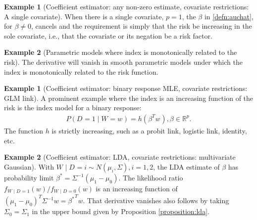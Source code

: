 \documentclass[12pt]{article}
\renewcommand{\P}{P}
\newcommand{\W}[1][]{W_{#1}}
\newcommand{\w}[1][]{w_{#1}}
\newcommand{\D}[1][]{D_{#1}}
\renewcommand{\t}[1]{{#1}^T}
\renewcommand{\star}[1]{{#1}^\ast}
\newcommand{\h}{h}
\theoremstyle{definition}
\newtheorem{example}{Example}%
\newtheorem{subexample}{Example}%
\begin{document}
\begin{example}[Coefficient estimator: any non-zero estimate,
  covariate restrictions: A single covariate] When there is a single
  covariate, $p=1$, the $\beta$ in \eqref{defn:auchat},
  for $\beta\neq 0$, cancels and the requirement is simply that the
  risk be increasing in the sole covariate, i.e., that the covariate
  or its negation be a risk
  factor.%
\end{example}

\begin{example}[Parametric models where index is monotonically related
  to the risk]\label{example:auc:glm} The derivative will vanish in smooth parametric models
  under which the index is monotonically related to the risk
  function.%
\begin{subexample}[Coefficient estimator: binary response MLE, covariate
restrictions: GLM link]\label{example:auc:glm} A prominent example where the index is an
increasing function of the risk is the index model for a binary
response:
\begin{align}
  \P(\D=1\mid\W=\w) = \h(\t\beta \w), \beta\in\mathbb{R}^p.
\end{align}
The function $\h$ is strictly increasing, such as a probit link,
logistic link, identity, etc.
\end{subexample}


\begin{subexample}[Coefficient estimator: LDA, covariate restrictions:
  multivariate Gaussian]\label{example:auc:lda} With $\W\mid\D=i\sim N(\mu_i,\Sigma),i=1,2$,
  the LDA estimate of $\beta$ has probability limit
  $\star\beta=\Sigma^{-1}(\mu_1-\mu_0)$. The likelihood ratio
  $f_{\W\mid\D=1}(w)/f_{\W\mid\D=0}(w)$ is an increasing function of
  $\t{(\mu_1-\mu_0)}\Sigma^{-1}w=\t{\star\beta}w$. That derivative
  vanishes also follows by taking $\Sigma_0=\Sigma_1$ in the upper bound given by Proposition
  \ref{proposition:lda}.
\end{subexample}


\end{example}
\end{document}

